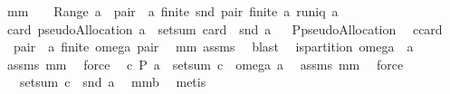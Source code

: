 \begin{isabellebody}
\ mm{}{}{\isacharcolon}\ \ {\isachardoublequoteopen}{\isacharbraceleft}{\isacharbraceright}\ {\isasymnotin}\ Range\ a{\isachardoublequoteclose}\ {\isachardoublequoteopen}{\isasymforall}\ pair\ {\isasymin}\ a{\isachardot}\ finite\ {\isacharparenleft}snd\ pair{\isacharparenright}{\isachardoublequoteclose}\ {\isachardoublequoteopen}finite\ a{\isachardoublequoteclose}\ {\isachardoublequoteopen}runiq\ a{\isachardoublequoteclose}\ \isanewline
{}\ {\isachardoublequoteopen}card\ {\isacharparenleft}pseudoAllocation\ a{\isacharparenright}\ {\isacharequal}\ setsum\ {\isacharparenleft}card\ {\isasymcirc}\ snd{\isacharparenright}\ a{\isachardoublequoteclose}\isanewline
%
\isadelimproof
%
\endisadelimproof
%
\isatagproof
{}\isamarkupfalse%
\ {\isacharminus}\isanewline
{}\isamarkupfalse%
\ {\isacharquery}P{\isacharequal}pseudoAllocation\ \isamarkupfalse%
\ {\isacharquery}c{\isacharequal}card\isanewline
{}\isamarkupfalse%
\ {\isachardoublequoteopen}{\isasymforall}\ pair\ {\isasymin}\ a{\isachardot}\ finite\ {\isacharparenleft}omega\ pair{\isacharparenright}{\isachardoublequoteclose}\ \isamarkupfalse%
\ mm{}{}\ assms\ \isamarkupfalse%
\ blast\ \isamarkupfalse%
\isanewline
{}\isamarkupfalse%
\ {\isachardoublequoteopen}is{\isacharunderscore}partition\ {\isacharparenleft}omega\ {\isacharbackquote}\ a{\isacharparenright}{\isachardoublequoteclose}\ \isamarkupfalse%
\ assms\ mm{}{}\ \isamarkupfalse%
\ force\ \isamarkupfalse%
\isanewline
{}\isamarkupfalse%
\ {\isachardoublequoteopen}{\isacharquery}c\ {\isacharparenleft}{\isacharquery}P\ a{\isacharparenright}\ {\isacharequal}\ setsum\ {\isacharparenleft}{\isacharquery}c\ {\isasymcirc}\ omega{\isacharparenright}\ a{\isachardoublequoteclose}\ \isamarkupfalse%
\ assms\ mm{}{}\ \isamarkupfalse%
\ force\isanewline
{}\isamarkupfalse%
\ \isamarkupfalse%
\ {\isachardoublequoteopen}{\isachardot}{\isachardot}{\isachardot}\ {\isacharequal}\ setsum\ {\isacharparenleft}{\isacharquery}c\ {\isasymcirc}\ snd{\isacharparenright}\ a{\isachardoublequoteclose}\ \isamarkupfalse%
\ mm{}{}b\ \isamarkupfalse%
\ metis\isanewline
{}\isamarkupfalse%
\ \isamarkupfalse%

\end{isabellebody}
